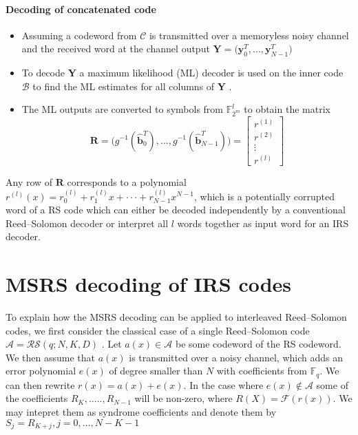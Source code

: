 \documentclass[fontsize=12pt]{article}
\begin{document}
\paragraph{Decoding of concatenated code}
\begin{itemize}
\item Assuming a codeword from $\mathcal{C}$ is transmitted over a memoryless noisy channel and the received word at the channel output $\textbf{Y} = \Big( \textbf{y}_0^T,...,\textbf{y}_{N-1}^T\Big)$

\item To decode \textbf{Y}  a maximum likelihood (ML) decoder is used on the inner code $\mathcal{B}$ to find the ML estimates for all columns of \textbf{Y} .

\item The ML outputs are converted to symbols from $\mathbb{F}^l_{2^m}$ to obtain the matrix 
\begin{equation}
\mathbf{R}=\Big( g^{-1}(\hat{\textbf{b}}^T_0),...,g^{-1}(\hat{\textbf{b}}^T_{N-1})\Big) = 
\begin{bmatrix}
           r^{(1)} \\
           r^{(2)} \\
           \vdots \\
            r^{(l)}
         \end{bmatrix}
\end{equation}
\end{itemize}
Any row of $\mathbf{R}$ corresponds to a polynomial $r^{(l)}(x)=r^{(l)}_0+r^{(l)}_1x+\cdot\cdot\cdot+r^{(l)}_{N-1}x^{N-1}$, which is a potentially corrupted word
of a RS code which can either be decoded independently by a conventional Reed–Solomon decoder or interpret all $l$ words together as input word for an
IRS decoder.
\section{MSRS decoding of IRS codes}
To explain how the MSRS decoding can be applied to interleaved
Reed–Solomon codes, we first consider the classical
case of a single Reed–Solomon code $\mathcal{A} =\mathcal{RS}(q;N,K,D) $ .
Let $a(x) \in \mathcal{A}$ be some codeword of the RS codeword.
We then assume that $a(x)$ is transmitted over a noisy channel, which adds an error
polynomial $e(x)$ of degree smaller than $N$ with coefficients from $\mathbb{F}_q$.
We can then rewrite $r(x)=a(x)+e(x)$. In the case where $e(x) \notin \mathcal{A}$
some of the coefficients $R_K,.....,R_{N-1}$ will be non-zero, where $R(X)=\mathscr{F}(r(x))$. We may intepret them as syndrome coefficients and denote them by  $S_j = R_{K+j}, j= 0,...,N-K-1$
\end{document}
